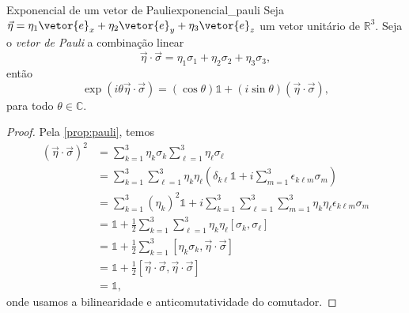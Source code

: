 \begin{proposition}{Exponencial de um vetor de Pauli}{exponencial_pauli}
    Seja \(\vec\eta = \eta_1 \vetor{e}_x + \eta_2\vetor{e}_y + \eta_3 \vetor{e}_z\) um vetor unitário de \(\mathbb{R}^3\). Seja o \emph{vetor de Pauli} a combinação linear
    \begin{equation*}
        \vec\eta \cdot \vec\sigma = \eta_1 \sigma_1 + \eta_2 \sigma_2 + \eta_3 \sigma_3,
    \end{equation*}
    então
    \begin{equation*}
        \exp(i \theta \vec\eta \cdot \vec\sigma) = (\cos\theta)\mathds{1} + (i\sin\theta)(\vec\eta \cdot\vec\sigma),
    \end{equation*}
    para todo \(\theta\in \mathbb{C}.\)
\end{proposition}
\begin{proof}
    Pela \cref{prop:pauli}, temos
    \begin{align*}
        (\vec \eta \cdot \vec \sigma)^2 &= \sum_{k=1}^3 \eta_k \sigma_k \sum_{\ell = 1}^3 \eta_\ell \sigma_\ell\\
                                        &= \sum_{k=1}^3\sum_{\ell=1}^3 \eta_k \eta_\ell \left(\delta_{k\ell}\mathds{1} + i \sum_{m = 1}^3 \epsilon_{k\ell m}\sigma_m\right)\\
                                        &= \sum_{k=1}^3 (\eta_k)^2 \mathds{1} + i\sum_{k=1}^3\sum_{\ell=1}^3 \sum_{m = 1}^3 \eta_k \eta_\ell\epsilon_{k\ell m}\sigma_m\\
                                        &= \mathds{1} + \frac12 \sum_{k=1}^3\sum_{\ell=1}^3 \eta_k \eta_\ell [\sigma_k, \sigma_\ell]\\
                                        &= \mathds{1} + \frac12 \sum_{k=1}^3 [\eta_k \sigma_k, \vec \eta \cdot \vec \sigma]\\
                                        &= \mathds{1} + \frac12 [\vec \eta\cdot \vec \sigma, \vec \eta\cdot \vec \sigma]\\
                                        &= \mathds{1},
    \end{align*}
    onde usamos a bilinearidade e anticomutatividade do comutador.


\end{proof}
